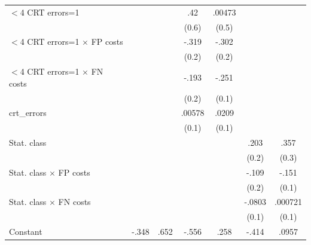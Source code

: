 {\begin{tabular}{l*{6}{c}}
$<$4 CRT errors=1&                  &                  &      .42         &   .00473         &                  &                  \\
                &                  &                  &    (0.6)         &    (0.5)         &                  &                  \\
$<$4 CRT errors=1 $\times$ FP costs&                  &                  &    -.319         &    -.302         &                  &                  \\
                &                  &                  &    (0.2)         &    (0.2)         &                  &                  \\
$<$4 CRT errors=1 $\times$ FN costs&                  &                  &    -.193         &    -.251\sym{**} &                  &                  \\
                &                  &                  &    (0.2)         &    (0.1)         &                  &                  \\
crt\_errors      &                  &                  &   .00578         &    .0209         &                  &                  \\
                &                  &                  &    (0.1)         &    (0.1)         &                  &                  \\
Stat. class     &                  &                  &                  &                  &     .203         &     .357         \\
                &                  &                  &                  &                  &    (0.2)         &    (0.3)         \\
Stat. class $\times$ FP costs&                  &                  &                  &                  &    -.109         &    -.151         \\
                &                  &                  &                  &                  &    (0.2)         &    (0.1)         \\
Stat. class $\times$ FN costs&                  &                  &                  &                  &   -.0803         &  .000721         \\
                &                  &                  &                  &                  &    (0.1)         &    (0.1)         \\
Constant        &    -.348         &     .652\sym{*}  &    -.556         &     .258         &    -.414         &    .0957         \\

\end{tabular}}
